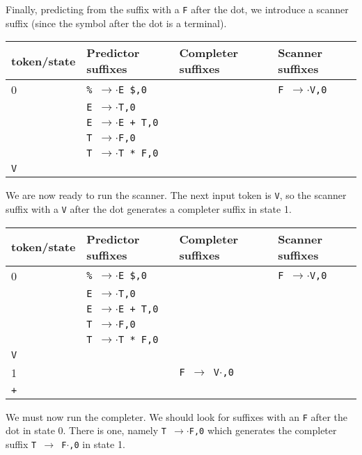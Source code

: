 \documentclass[11pt]{article}
\def\ra{\rightarrow}
\begin{document}
Finally, predicting from the suffix with a \texttt{F} after the dot,
we introduce a scanner suffix (since the symbol after the dot is a terminal).

\begin{tabular}{|l|l|l|l|}
\hline
token/state & Predictor suffixes & Completer suffixes & Scanner suffixes\\
\hline
0     & \texttt{\% $\ra$$\cdot$E \$,0} & & \texttt{F $\ra$$\cdot$V,0}\\
      & \texttt{E $\ra$$\cdot$T,0} & & \\
      & \texttt{E $\ra$$\cdot$E + T,0} & & \\
      & \texttt{T $\ra$$\cdot$F,0} & & \\
      & \texttt{T $\ra$$\cdot$T * F,0} & & \\
\hline
\texttt{V}     &  & &\\
\hline
\end{tabular}

We are now ready to run the scanner.  The next input token is
\texttt{V}, so the scanner suffix with a \texttt{V} after the dot
generates a completer suffix in state 1. 

\begin{tabular}{|l|l|l|l|}
\hline
token/state & Predictor suffixes & Completer suffixes & Scanner suffixes\\
\hline
 0    & \texttt{\% $\ra$$\cdot$E \$,0} & & \texttt{F $\ra$$\cdot$V,0}\\
      & \texttt{E $\ra$$\cdot$T,0} & & \\
      & \texttt{E $\ra$$\cdot$E + T,0} & & \\
      & \texttt{T $\ra$$\cdot$F,0} & & \\
      & \texttt{T $\ra$$\cdot$T * F,0} & & \\
\hline
\texttt{V}     &  & &\\
\hline
1     &  &  \texttt{F $\ra$ V$\cdot$,0}& \\
\hline
\texttt{+} &  & &\\
\hline
\end{tabular}

We must now run the completer.  We should look for suffixes with an
\texttt{F} after the dot in state 0.  There is one, namely \texttt{T
$\ra$$\cdot$F,0} which generates the completer suffix \texttt{T $\ra$
F$\cdot$,0} in state 1.
\end{document}
